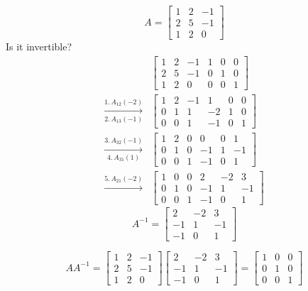 \documentclass[../main.tex]{subfiles}
\begin{document}
\begin{example}[]
    \[ A = \begin{bmatrix}
        1 & 2 & -1 \\
        2 & 5 & -1 \\
        1 & 2 & 0
    \end{bmatrix} \]
    Is it invertible?
    \begin{align*}
        &\begin{bmatrix}
            1 & 2 & -1 & 1 & 0 & 0 \\
            2 & 5 & -1 & 0 & 1 & 0 \\
            1 & 2 & 0 & 0 & 0 & 1
        \end{bmatrix} \\[2mm]
        \xrightarrow[2. \, A_{13}(-1)]{1. \, A_{12}(-2)}
        &\begin{bmatrix}
            1 & 2 & -1 & 1 & 0 & 0 \\
            0 & 1 & 1 & -2 & 1 & 0 \\
            0 & 0 & 1 & -1 & 0 & 1
        \end{bmatrix} \\[2mm]
        \xrightarrow[4. \, A_{31}(1)]{3. \, A_{32}(-1)}
        &\begin{bmatrix}
            1 & 2 & 0 & 0 & 0 & 1 \\
            0 & 1 & 0 & -1 & 1 & -1 \\
            0 & 0 & 1 & -1 & 0 & 1
        \end{bmatrix} \\[2mm]
        \xrightarrow{5. \, A_{21}(-2)}
        &\begin{bmatrix}
            1 & 0 & 0 & 2 & -2 & 3 \\
            0 & 1 & 0 & -1 & 1 & -1 \\
            0 & 0 & 1 & -1 & 0 & 1
        \end{bmatrix}
    \end{align*}
    \[ A^{-1} = \begin{bmatrix}
        2 & -2 & 3 \\
        -1 & 1 & -1 \\
        -1 & 0 & 1
    \end{bmatrix} \]

    \[ AA^{-1} =
        \begin{bmatrix}
            1 & 2 & -1 \\
            2 & 5 & -1 \\
            1 & 2 & 0
        \end{bmatrix}
        \begin{bmatrix}
            2 & -2 & 3 \\
            -1 & 1 & -1 \\
            -1 & 0 & 1
        \end{bmatrix}
        = \begin{bmatrix}
            1 & 0 & 0 \\
            0 & 1 & 0 \\
            0 & 0 & 1
        \end{bmatrix}
    \]
\end{example}
\end{document}
